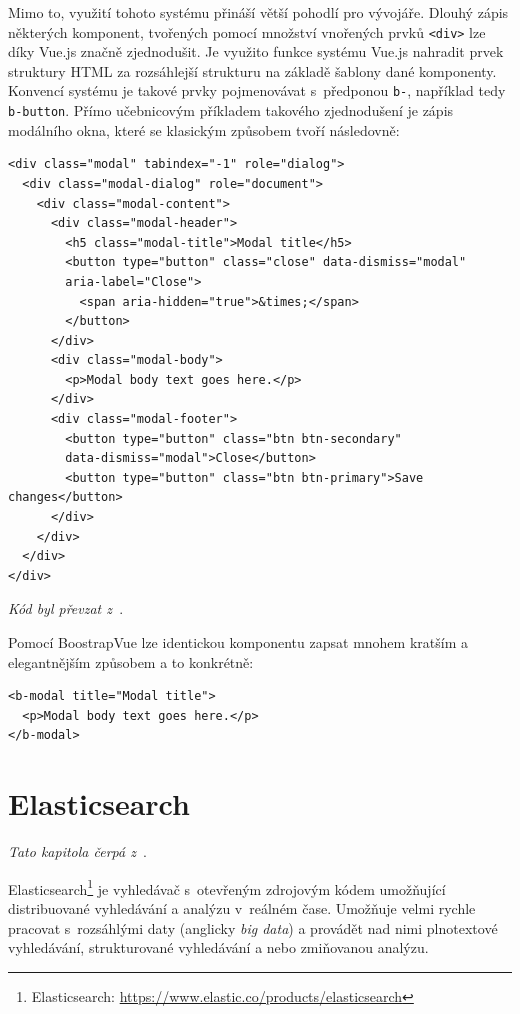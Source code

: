 Mimo to, využití tohoto systému přináší větší pohodlí pro vývojáře. Dlouhý zápis některých komponent, tvořených pomocí množství vnořených prvků \texttt{<div>} lze díky Vue.js značně zjednodušit. Je využito funkce systému Vue.js nahradit prvek struktury HTML za rozsáhlejší strukturu na základě šablony dané komponenty. Konvencí systému je takové prvky pojmenovávat s~předponou \texttt{b-}, například tedy \texttt{b-button}.
Přímo učebnicovým příkladem takového zjednodušení je zápis modálního okna, které se klasickým způsobem tvoří následovně:

\begin{verbatim}
<div class="modal" tabindex="-1" role="dialog">
  <div class="modal-dialog" role="document">
    <div class="modal-content">
      <div class="modal-header">
        <h5 class="modal-title">Modal title</h5>
        <button type="button" class="close" data-dismiss="modal"
        aria-label="Close">
          <span aria-hidden="true">&times;</span>
        </button>
      </div>
      <div class="modal-body">
        <p>Modal body text goes here.</p>
      </div>
      <div class="modal-footer">
        <button type="button" class="btn btn-secondary"
        data-dismiss="modal">Close</button>
        <button type="button" class="btn btn-primary">Save changes</button>
      </div>
    </div>
  </div>
</div>
\end{verbatim}
\emph{Kód byl převzat z~\cite{bib:bootstrap-modal}}.

Pomocí BoostrapVue lze identickou komponentu zapsat mnohem kratším a elegantnějším způsobem a to konkrétně:

\begin{verbatim}
<b-modal title="Modal title">
  <p>Modal body text goes here.</p>
</b-modal>
\end{verbatim}




\section{Elasticsearch}
\emph{Tato kapitola čerpá z~\cite{bib:elastic-defnitive}}.

Elasticsearch\footnote{Elasticsearch: \url{https://www.elastic.co/products/elasticsearch}} je vyhledávač s~otevřeným zdrojovým kódem umožňující distribuované vyhledávání a analýzu v~reálném čase. Umožňuje velmi rychle pracovat s~rozsáhlými daty (anglicky \emph{big data}) a provádět nad nimi plnotextové vyhledávání, strukturované vyhledávání a nebo zmiňovanou analýzu.

